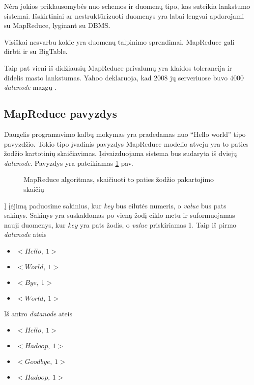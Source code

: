 \documentclass[10pt]{IEEEtran}
\begin{document}
		Nėra jokios priklausomybės nuo schemos ir duomenų tipo, kas suteikia lankstumo sistemai. Išskirtiniai ar nestruktūrizuoti duomenys yra labai lengvai apdorojami su MapReduce, lyginant su DBMS.

		Visiškai nesvarbu kokie yra duomenų talpinimo sprendimai. MapReduce gali dirbti ir su BigTable.

		Taip pat vieni iš didžiausių MapReduce privalumų yra klaidos tolerancija ir didelis masto lankstumas. Yahoo deklaruoja, kad 2008 jų serveriuose buvo 4000 \textit{datanode} mazgų \cite{shvachko2008scaling}.

	\subsection{MapReduce pavyzdys}

		Daugelis programavimo kalbų mokymas yra pradedamas nuo ``Hello world'' tipo pavyzdžio. Tokio tipo įvadinis pavyzdys MapReduce modelio atveju yra to paties žodžio kartotinių skaičiavimas. Įsivaizduojama sistema bus sudaryta iš dviejų \textit{datanode}. Pavyzdys yra pateikiamas \ref{lst:mapreduce} pav.

		\begin{figure}
			
			\caption{MapReduce algoritmas, skaičiuoti to paties žodžio pakartojimo skaičių}
			\label{lst:mapreduce}
		\end{figure}

		Į įėjimą paduosime sakinius, kur \textit{key} bus eilutės numeris, o \textit{value} bus pats sakinys. Sakinys yra suskaldomas po vieną žodį ciklo metu ir suformuojamas nauji duomenys, kur \textit{key} yra pats žodis, o \textit{value} priskiriamas 1. Taip iš pirmo \textit{datanode} ateis 

		\begin{itemize}
			\item $<Hello,~1>$
			\item $<World,~1>$
			\item $<Bye,~1>$
			\item $<World,~1>$
		\end{itemize}

		Iš antro \textit{datanode} ateis

		\begin{itemize}
			\item $<Hello,~1>$
			\item $<Hadoop,~1>$
			\item $<Goodbye,~1>$
			\item $<Hadoop,~1>$
		\end{itemize}
\end{document}
